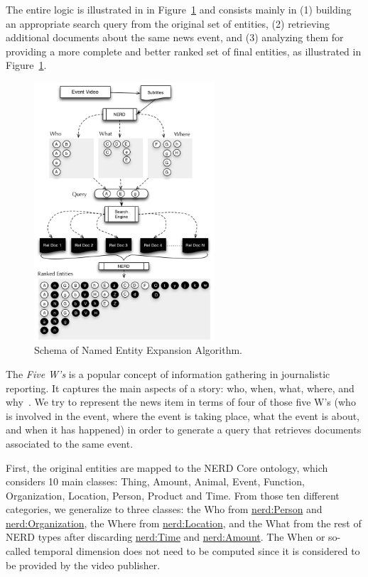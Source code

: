 \documentclass{llncs}
\begin{document}
The entire logic is illustrated in in Figure~\ref{fig:namedEntityExpansion} and consists mainly in (1) building an appropriate search query from the original set of entities, (2) retrieving additional documents about the same news event, and (3) analyzing them for providing a more complete and better ranked set of final entities, as illustrated in Figure~\ref{fig:namedEntityExpansion}.

\begin{figure}[h!]
\centering
\includegraphics[width=0.6\textwidth]{figure/ExpansionDiagram}
\caption{Schema of Named Entity Expansion Algorithm.}
\label{fig:namedEntityExpansion}%
\end{figure}

The \emph{Five W's} is a popular concept of information gathering in journalistic reporting. It captures the main aspects of a story: who, when, what, where, and why~\cite{LiJia2007}. We try to represent the news item in terms of four of those five W's (who is involved in the event, where the event is taking place, what the event is about, and when it has happened) in order to generate a query that retrieves documents associated to the same event.

First, the original entities are mapped to the NERD Core ontology, which considers 10 main classes: Thing, Amount, Animal, Event, Function, Organization, Location, Person, Product and Time. From those ten different categories, we generalize to three classes: the Who from \url{nerd:Person} and \url{nerd:Organization}, the Where from \url{nerd:Location}, and the What from the rest of NERD types after discarding \url{nerd:Time} and \url{nerd:Amount}. The When or so-called temporal dimension does not need to be computed since it is considered to be provided by the video publisher.
\end{document}
